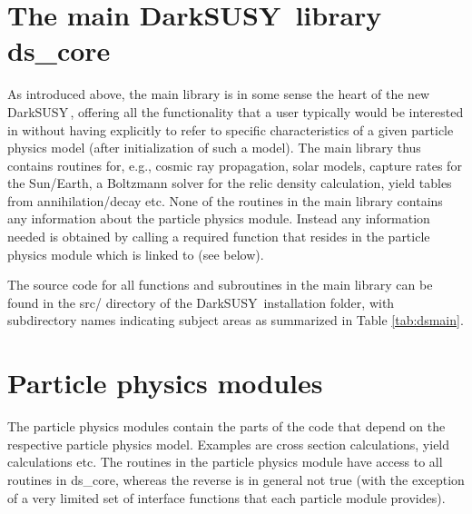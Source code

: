 \documentclass[a4paper,10pt,oneside]{book}
\newcommand{\code}[1]{\ft{#1}}
\newcommand{\ds}{{\sffamily DarkSUSY}}
\newcommand{\ft}[1]{\textsf{#1}}
\begin{document}
\section{The main \ds\ library \code{ds\_core}}

 As introduced above, the main library is in some sense the heart of the new \ds\,,
offering all the functionality that a user typically would be interested in without having 
explicitly to refer to specific characteristics of a given particle physics model (after
initialization of such a model).
 The main library thus contains routines for, e.g., 
cosmic ray propagation, solar models, capture rates for the Sun/Earth, a 
Boltzmann solver for the relic density calculation, yield tables from annihilation/decay etc. 
None of the routines in the main library contains any information about the particle 
physics module. Instead any information needed is obtained by calling a required 
function that resides in the  particle physics module which is linked to (see below). 

The source code for all functions and subroutines in the main library can be found in the 
\code{src/} directory of the \ds\ installation folder, with subdirectory names indicating  
subject areas as summarized in Table \ref{tab:dsmain}.


\section{Particle physics modules}
\label{sec:particle_modules}

 The particle physics modules contain the parts of the code that 
depend on the respective 
particle physics model. Examples are cross section calculations, yield calculations etc. 
The routines in the particle physics module have access to all routines in 
\code{ds\_core}, whereas the reverse is in general not true (with the exception of a very limited 
set of interface functions that each particle module provides). 
\end{document}
